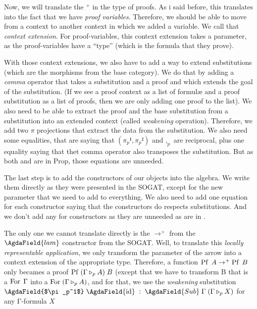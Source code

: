 \documentclass[10pt,a4paper]{article}
\begin{document}
			\begin{tcolorbox}
				\agdasep
			\end{tcolorbox}
		
			Now, we will translate the ${}^+$ in the type of proofs. As i said before, this translates into the fact that we have \emph{proof variables}. Therefore, we should be able to move from a context to another context in which we added a variable. We call that \emph{context extension}. For proof-variables, this context extension takes a parameter, as the proof-variables have a \enquote{type} (which is the formula that they prove).
			
			With those context extensions, we also have to add a way to extend substitutions (which are the morphisms from the base category). We do that by adding a \emph{comma} operator that takes a substitution and a proof and which extends the goal of the substitution. (If we see a proof context as a list of formulæ and a proof substitution as a list of proofs, then we are only adding one proof to the list). We also need to be able to extract the proof and the base substitution from a substitution into an extended context (called \emph{weakening} operation). Therefore, we add two $\pi$ projections that extract the data from the substitution. We also need some equalities, that are saying that $(\pi_p¹ , \pi_p²)$ and $,_p$ are reciprocal, plus one equality saying that thet comma operator also transposes the substitution. But as both  and  are in Prop, those equations are unneeded.
			
			\begin{tcolorbox}
				\agda{agda/ZOL-5.tex}
			\end{tcolorbox}
			
			The last step is to add the constructors of our objects into the algebra. We write them directly as they were presented in the SOGAT, except for the new  parameter that we need to add to everything. We also need to add one equation for each constructor saying that the constructors do respects substitutions. And we don't add any for  constructors as they are unneeded as  are in .
		
			The only one we cannot translate directly is the $\rightarrow^+$ from the $\AgdaField{lam}$ constructor from the SOGAT. Well, to translate this \emph{locally representable application}, we only transform the parameter of the arrow into a context extension of the appropriate type. Therefore, a function $\operatorname{Pf}\; A \rightarrow^+ \operatorname{Pf}\; B$ only becames a proof $\operatorname{Pf}\; (\Gamma \triangleright_p A)\; B$ (except that we have to transform B that is a $\operatorname{For}\;\Gamma$ into a $\operatorname{For}\;(\Gamma \triangleright_p A)$, and for that, we use the \emph{weakening} substitution $\text{\AgdaField{$\pi_p^1$}}\;\text{\AgdaField{id}}\;:\;\AgdaField{Sub}\;\Gamma\;(\Gamma \triangleright_p X)$ for any Γ-formula $X$
		
\end{document}

